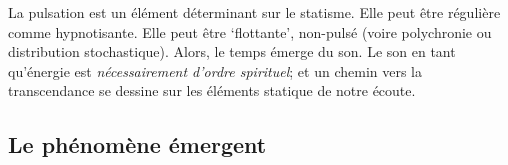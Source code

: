 \documentclass{article}
\begin{document}










La pulsation est un élément déterminant sur le statisme. Elle peut être régulière comme hypnotisante. Elle peut être `flottante', non-pulsé (voire polychronie ou distribution stochastique). Alors, le temps émerge du son. Le son en tant qu'énergie est \textit{nécessairement d’ordre spirituel}; et un chemin vers la transcendance se dessine sur les éléments statique de notre écoute.



\subsection{Le phénomène émergent}
 
\end{document}
